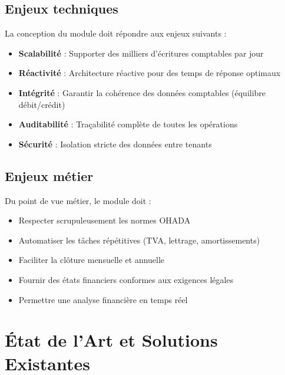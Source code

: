 \documentclass[12pt]{report}
\begin{document}
\section{Enjeux techniques}
La conception du module doit répondre aux enjeux suivants :
\begin{itemize}
    \item \textbf{Scalabilité} : Supporter des milliers d'écritures comptables par jour
    \item \textbf{Réactivité} : Architecture réactive pour des temps de réponse optimaux
    \item \textbf{Intégrité} : Garantir la cohérence des données comptables (équilibre débit/crédit)
    \item \textbf{Auditabilité} : Traçabilité complète de toutes les opérations
    \item \textbf{Sécurité} : Isolation stricte des données entre tenants
\end{itemize}

\section{Enjeux métier}
Du point de vue métier, le module doit :
\begin{itemize}
    \item Respecter scrupuleusement les normes OHADA
    \item Automatiser les tâches répétitives (TVA, lettrage, amortissements)
    \item Faciliter la clôture mensuelle et annuelle
    \item Fournir des états financiers conformes aux exigences légales
    \item Permettre une analyse financière en temps réel
\end{itemize}

\chapter{État de l'Art et Solutions Existantes}
\end{document}
